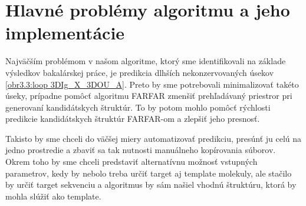 \section{Hlavné problémy algoritmu a jeho implementácie}
Najväčším problémom v našom algoritme, ktorý sme identifikovali na základe výsledkov bakalárskej práce, je predikcia dlhších nekonzervovaných úsekov \ref{obr3.3:loop 3DIg_X_3DOU_A}. Preto by sme potrebovali minimalizovať takéto úseky, prípadne pomôcť algoritmu FARFAR zmenšiť prehľadávaný priestror pri generovaní kandidátskych štruktúr. To by potom mohlo pomôcť rýchlosti predikcie kandidátskych štruktúr FARFAR-om a zlepšiť jeho presnosť.

\indent Takisto by sme chceli do väčšej miery automatizovať predikciu, presúnť ju celú na jedno prostredie a zbaviť sa tak nutnosti manuálneho kopírovania súborov. Okrem toho by sme chceli predstaviť alternatívnu možnosť vstupných parametrov, kedy by nebolo treba určiť target aj template molekuly, ale stačilo by určiť target sekvenciu a algoritmus by sám našiel vhodnú štruktúru, ktorá by mohla slúžiť ako template. 
